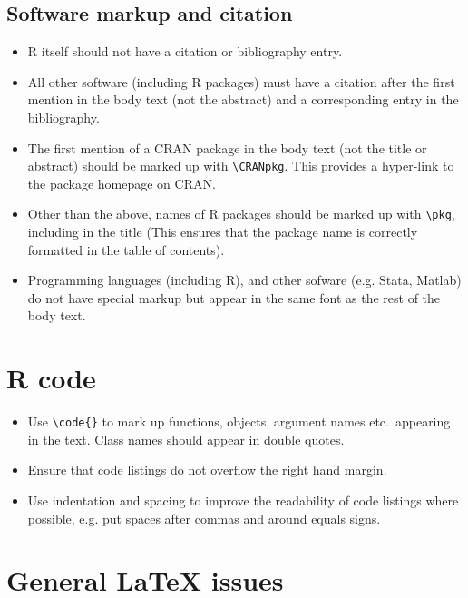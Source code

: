 \documentclass[11pt]{article}
\begin{document}
\subsection*{Software markup and citation}
\begin{itemize}
\item R itself should not have a citation or bibliography entry.
\item All other software (including R packages) must have a citation after
  the first mention in the body text (not the abstract) and a
  corresponding entry in the bibliography.
\item The first mention of a CRAN package in the body text (not the title or
  abstract) should be marked up with \verb+\CRANpkg+. This
  provides a hyper-link to the package homepage on CRAN.
\item Other than the above, names of R packages should be marked up with 
  \verb+\pkg+, including in the title (This ensures that the
  package name is correctly formatted in the table of contents).
\item Programming languages (including R), and other sofware
  (e.g. Stata, Matlab) do not have special markup but appear in the
  same font as the rest of the body text.
\end{itemize}

\section*{R code}

\begin{itemize}
\item Use \verb+\code{}+ to mark up functions, objects, argument names etc.\
appearing in the text.  Class names should appear in double quotes.
\item Ensure that code listings do not overflow the right hand margin.
\item Use indentation and spacing to improve the readability of code
  listings where possible, e.g. put spaces after commas and around
  equals signs.
\end{itemize}

\section*{General LaTeX issues}
\end{document}
